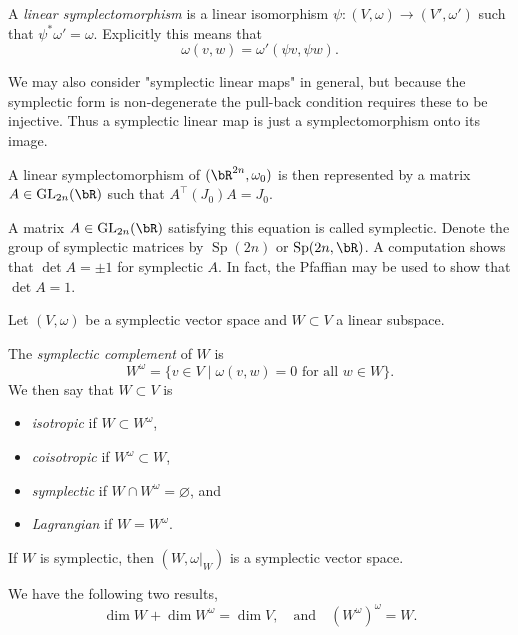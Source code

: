 \begin{dfn}
    A \emph{linear symplectomorphism} is a linear isomorphism $\psi:(V,\omega)\to(V',\omega')$ such that $\psi^*\omega'=\omega$.
    Explicitly this means that
    \[\omega(v,w)=\omega'(\psi v,\psi w).\]
\end{dfn}

\begin{remark}
    We may also consider "symplectic linear maps" in general, but because the symplectic form is non-degenerate the pull-back condition requires these to be injective.
    Thus a symplectic linear map is just a symplectomorphism onto its image.
\end{remark}

A linear symplectomorphism of $(\bR^{2n},\omega_0)$ is then represented by a matrix $A\in\operatorname{GL}_{2n}(\bR)$ such that $A^\intercal(J_0)A=J_0$.

\begin{dfn}
    A matrix $A\in\operatorname{GL}_{2n}(\bR)$ satisfying this equation is called symplectic.
    Denote the group of symplectic matrices by $\operatorname{Sp}(2n)$ or $\operatorname{Sp}(2n,\bR)$.
    A computation shows that $\det A=\pm1$ for symplectic $A$.
    In fact, the Pfaffian may be used to show that $\det A=1$.
\end{dfn}

Let $(V,\omega)$ be a symplectic vector space and $W\subset V$ a linear subspace.

\begin{dfn}
    The \emph{symplectic complement} of $W$ is
    \[W^\omega=\{v\in V\mid\omega(v,w)=0\text{ for all }w\in W\}.\]
    We then say that $W\subset V$ is
    \begin{itemize}
        \item \emph{isotropic} if $W\subset W^\omega$,
        \item \emph{coisotropic} if $W^\omega\subset W$,
        \item \emph{symplectic} if $W\cap W^\omega=\varnothing$, and
        \item \emph{Lagrangian} if $W=W^\omega$.
    \end{itemize}
    If $W$ is symplectic, then $(W,\omega|_W)$ is a symplectic vector space.
\end{dfn}

\begin{lem}
    We have the following two results,
    \[\dim W+\dim W^\omega=\dim V,\quad\text{and}\quad (W^\omega)^\omega=W.\]
\end{lem}

